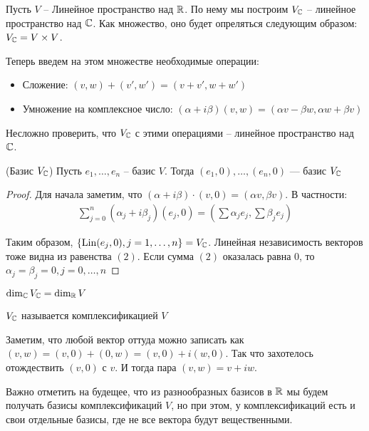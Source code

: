 Пусть $V$ -- Линейное пространство над $\mathbb{R}$. По нему мы построим $V_{\mathbb{C}}$ -- линейное пространство над $\mathbb{C}$.
Как множество, оно будет опреляться следующим образом: $V_{\mathbb{C}} = V \times V$. 

Теперь введем на этом множестве необходимые операции: 
\begin{itemize}
    \item Сложение: $(v, w) + (v', w') = (v + v', w + w')$
    \item Умножение на комплексное число: $(\alpha + i \beta)(v, w) = (\alpha v - \beta w, \alpha w + \beta v)$ 
\end{itemize}
Несложно проверить, что $V_{\mathbb{C}}$ с этими операциями -- линейное пространство над $\mathbb{C}$.

\begin{theorem-non}(Базис $V_{\mathbb{C}}$)
    Пусть $e_1, \dots, e_n$ -- базис $V$. Тогда $(e_1, 0), \dots, (e_n, 0)$ --- базис $V_{\mathbb{C}}$
\end{theorem-non}
\begin{proof} \quad 

    Для начала заметим, что $(\alpha + i \beta) \cdot (v, 0) = (\alpha v, \beta v)$. В частности: 
    \begin{gather}
        \sum\limits_{j=0}^{n} (\alpha_j + i \beta_j)(e_j, 0) = \left( \sum \alpha_j e_j, \sum \beta_j e_j \right)
    \end{gather}
    
    Таким образом, $\{ \operatorname{Lin}(e_j, 0), j = 1, \dots, n \} = V_{\mathbb{C}}$. Линейная независимость векторов тоже видна из равенства $(2)$. 
    Если сумма $(2)$ оказалась равна 0, то $\alpha_j = \beta_j = 0, j = 0, \dots, n$
\end{proof}

\follow $\dim_{\mathbb{C}} V_{\mathbb{C}} = \dim_{\mathbb{R}} V$

\begin{conj}
    $V_{\mathbb{C}}$ называется комплексификацией $V$
\end{conj}

Заметим, что любой вектор оттуда можно записать как $(v, w) = (v, 0) + (0, w) = (v, 0) + i(w, 0)$.
Так что захотелось отождествить $(v, 0)$ с $v$. И тогда пара $(v, w) = v + iw$.

Важно отметить на будещее, что из разнообразных базисов в $\mathbb{R}$ мы будем получать базисы комплексификаций $V$, 
но при этом, у комплексификаций есть и свои отдельные базисы, где не все вектора будут вещественными. 

